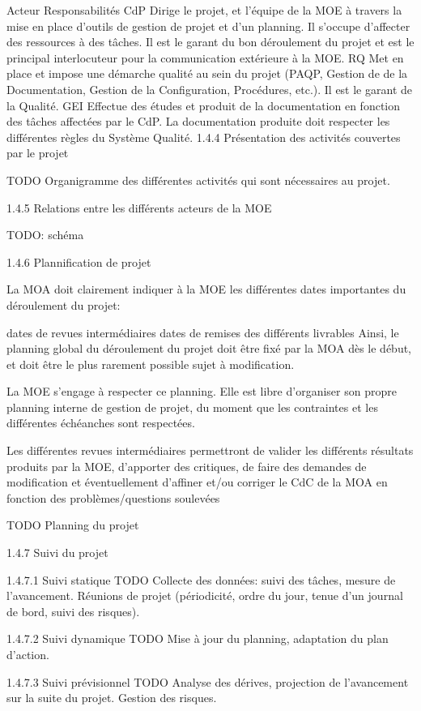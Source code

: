 Acteur	Responsabilités
CdP	Dirige le projet, et l'équipe de la MOE à travers la mise en place d'outils de gestion de projet et d'un planning. Il s'occupe d'affecter des ressources à des tâches. Il est le garant du bon déroulement du projet et est le principal interlocuteur pour la communication extérieure à la MOE.
RQ	Met en place et impose une démarche qualité au sein du projet (PAQP, Gestion de de la Documentation, Gestion de la Configuration, Procédures, etc.). Il est le garant de la Qualité.
GEI	Effectue des études et produit de la documentation en fonction des tâches affectées par le CdP. La documentation produite doit respecter les différentes règles du Système Qualité.
1.4.4   Présentation des activités couvertes par le projet

TODO Organigramme des différentes activités qui sont nécessaires au projet.

1.4.5   Relations entre les différents acteurs de la MOE

TODO: schéma

1.4.6   Plannification de projet

La MOA doit clairement indiquer à la MOE les différentes dates importantes du déroulement du projet:

dates de revues intermédiaires
dates de remises des différents livrables
Ainsi, le planning global du déroulement du projet doit être fixé par la MOA dès le début, et doit être le plus rarement possible sujet à modification.

La MOE s'engage à respecter ce planning. Elle est libre d'organiser son propre planning interne de gestion de projet, du moment que les contraintes et les différentes échéanches sont respectées.

Les différentes revues intermédiaires permettront de valider les différents résultats produits par la MOE, d'apporter des critiques, de faire des demandes de modification et éventuellement d'affiner et/ou corriger le CdC de la MOA en fonction des problèmes/questions soulevées

TODO Planning du projet

1.4.7   Suivi du projet

1.4.7.1   Suivi statique
TODO Collecte des données: suivi des tâches, mesure de l'avancement. Réunions de projet (périodicité, ordre du jour, tenue d'un journal de bord, suivi des risques).

1.4.7.2   Suivi dynamique
TODO Mise à jour du planning, adaptation du plan d'action.

1.4.7.3   Suivi prévisionnel
TODO Analyse des dérives, projection de l'avancement sur la suite du projet. Gestion des risques.

